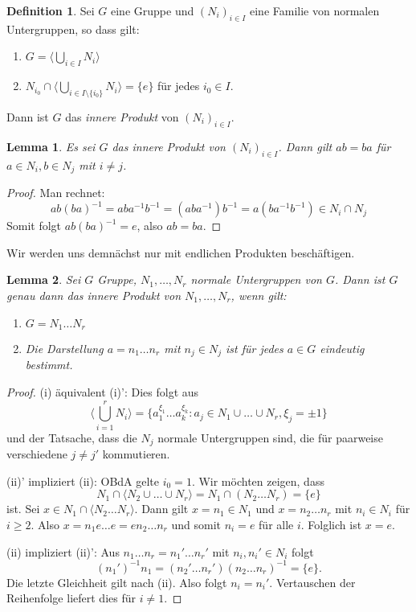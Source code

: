\documentclass[12pt]{scrartcl} %
\newcommand{\inv}[1]{\left(#1\right)^{-1}}
\newcommand{\Inv}[1]{#1^{-1}}
\newtheorem{lemma}{Lemma}
\theoremstyle{definition}
\newtheorem*{defn}{Definition}
\theoremstyle{remark}
\begin{document}
\begin{defn}
	Sei $G$ eine Gruppe und $(N_i)_{i\in I}$ eine Familie von normalen Untergruppen, so dass gilt:
	\begin{enumerate}[label=(\roman*)]
		\item $G=\langle\bigcup_{i\in I} N_i\rangle$
		\item $N_{i_0} \cap \langle\bigcup_{i\in I \setminus \{i_0\}} N_i\rangle = \{e\}$ für jedes $i_0\in I$.
	\end{enumerate}
	Dann ist $G$ das \emph{innere Produkt} von $(N_i)_{i\in I}$.
\end{defn}

\begin{lemma}
	Es sei $G$ das innere Produkt von $(N_i)_{i\in I}$.
	Dann gilt $ab=ba$ für $a\in N_i, b\in N_j$ mit $i\neq j$.
\end{lemma}

\begin{proof}
	Man rechnet: $$ab\inv{ba}=ab\Inv{a}\Inv{b}=(ab\Inv{a})\Inv{b}=a(b\Inv{a}\Inv{b}) \in N_i\cap N_j$$
	Somit folgt $ab\inv{ba}=e$, also $ab=ba$.
\end{proof}

Wir werden uns demnächst nur mit endlichen Produkten beschäftigen.

\begin{lemma}
	Sei $G$ Gruppe, $N_1,\dots,N_r$ normale Untergruppen von $G$.
	Dann ist $G$ genau dann das innere Produkt von $N_1,\dots,N_r$, wenn gilt:
	\begin{enumerate}[label=(\roman*)']
		\item $G=N_1\dots N_r$
		\item Die Darstellung $a=n_1\dots n_r$ mit $n_j\in N_j$ ist für jedes $a\in G$ eindeutig bestimmt.
	\end{enumerate}
\end{lemma}

\begin{proof}
	(i) äquivalent (i)': Dies folgt aus $$\langle\bigcup_{i=1}^r N_i\rangle = \{a_1^{\xi_1}\dots a_k^{\xi_k}: a_j\in N_1\cup\dots \cup N_r, \xi_j = \pm 1\}$$ und der Tatsache, dass die $N_j$ normale Untergruppen sind, die für paarweise verschiedene $j\neq j'$ kommutieren.

	(ii)' impliziert (ii): OBdA gelte $i_0=1$.
	Wir möchten zeigen, dass $$N_1\cap \langle N_2\cup\dots \cup N_r\rangle = N_1 \cap (N_2\dots N_r)= \{e\}$$ ist.
	Sei $x\in N_1\cap \langle N_2\dots N_r\rangle$.
	Dann gilt $x=n_1\in N_1$ und $x=n_2\dots n_r$ mit $n_i\in N_i$ für $i\geq 2$.
	Also $x=n_1e\dots e=en_2\dots n_r$ und somit $n_i=e$ für alle $i$.
	Folglich ist $x=e$.

	(ii) impliziert (ii)': Aus $n_1\dots n_r=n_1'\dots n_r'$ mit $n_i,n_i'\in N_i$ folgt $$\inv{n_1'}n_1=(n_2'\dots n_r')\inv{n_2\dots n_r} = \{e\}.$$
	Die letzte Gleichheit gilt nach (ii).
	Also folgt $n_i=n_i'$.
	Vertauschen der Reihenfolge liefert dies für $i\neq 1$.
\end{proof}
\end{document}
